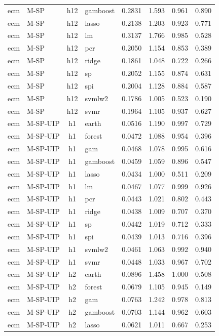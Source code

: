 \begin{ThreePartTable}
\begin{longtable}[t]{llclcccc}
ecm & M-SP & h12 & gamboost & 0.2831 & 1.593 & 0.961 & 0.890\\
ecm & M-SP & h12 & lasso & 0.2138 & 1.203 & 0.923 & 0.771\\
ecm & M-SP & h12 & lm & 0.3137 & 1.766 & 0.985 & 0.528\\
ecm & M-SP & h12 & pcr & 0.2050 & 1.154 & 0.853 & 0.389\\
ecm & M-SP & h12 & ridge & 0.1861 & 1.048 & 0.722 & 0.266\\
ecm & M-SP & h12 & sp & 0.2052 & 1.155 & 0.874 & 0.631\\
ecm & M-SP & h12 & spi & 0.2004 & 1.128 & 0.884 & 0.587\\
ecm & M-SP & h12 & svmlw2 & 0.1786 & 1.005 & 0.523 & 0.190\\
ecm & M-SP & h12 & svmr & 0.1964 & 1.105 & 0.937 & 0.627\\
\addlinespace
ecm & M-SP-UIP & h1 & earth & 0.0516 & 1.190 & 0.997 & 0.729\\
ecm & M-SP-UIP & h1 & forest & 0.0472 & 1.088 & 0.954 & 0.396\\
ecm & M-SP-UIP & h1 & gam & 0.0468 & 1.078 & 0.995 & 0.616\\
ecm & M-SP-UIP & h1 & gamboost & 0.0459 & 1.059 & 0.896 & 0.547\\
ecm & M-SP-UIP & h1 & lasso & 0.0434 & 1.000 & 0.511 & 0.209\\
ecm & M-SP-UIP & h1 & lm & 0.0467 & 1.077 & 0.999 & 0.926\\
ecm & M-SP-UIP & h1 & pcr & 0.0443 & 1.021 & 0.802 & 0.443\\
ecm & M-SP-UIP & h1 & ridge & 0.0438 & 1.009 & 0.707 & 0.370\\
ecm & M-SP-UIP & h1 & sp & 0.0442 & 1.019 & 0.712 & 0.333\\
ecm & M-SP-UIP & h1 & spi & 0.0439 & 1.013 & 0.716 & 0.396\\
ecm & M-SP-UIP & h1 & svmlw2 & 0.0461 & 1.063 & 0.992 & 0.940\\
ecm & M-SP-UIP & h1 & svmr & 0.0448 & 1.033 & 0.967 & 0.702\\
\addlinespace
ecm & M-SP-UIP & h2 & earth & 0.0896 & 1.458 & 1.000 & 0.508\\
ecm & M-SP-UIP & h2 & forest & 0.0679 & 1.105 & 0.945 & 0.149\\
ecm & M-SP-UIP & h2 & gam & 0.0763 & 1.242 & 0.978 & 0.813\\
ecm & M-SP-UIP & h2 & gamboost & 0.0703 & 1.144 & 0.962 & 0.603\\
ecm & M-SP-UIP & h2 & lasso & 0.0621 & 1.011 & 0.667 & 0.253\\

\end{longtable}
\end{ThreePartTable}
